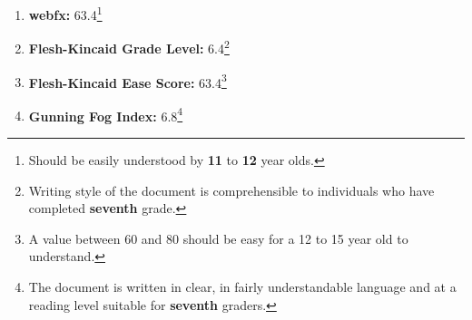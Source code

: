 \renewcommand{\thefootnote}{\alph{footnote}}
\begin{enumerate}[itemsep = 0.1 pt]

      \item{
            \textbf{webfx:} 63.4\footnote{Should be easily understood by \textbf{11} to \textbf{12} year olds.}
            }
      \item{
            \textbf{Flesh-Kincaid Grade Level:} 6.4\footnote{Writing style of the document is comprehensible to individuals who have completed \textbf{seventh} grade.}
            }
      \item{
            \textbf{Flesh-Kincaid Ease Score:} 63.4\footnote{A value between 60 and 80 should be easy for a 12 to 15 year old to understand.}
            }
      \item{
            \textbf{Gunning Fog Index:} 6.8\footnote{The document is written in clear, in fairly understandable language and at a reading level suitable for \textbf{seventh} graders.}
            }
\end{enumerate}